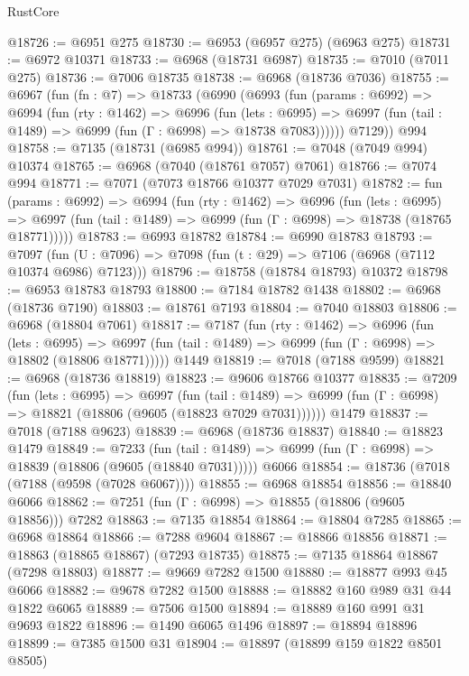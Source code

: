 \begin{lexlean}{RustCore}
\begin{coremodule}
@18726 := @6951 @275
@18730 := @6953 (@6957 @275) (@6963 @275)
@18731 := @6972 @10371
@18733 := @6968 (@18731 @6987)
@18735 := @7010 (@7011 @275)
@18736 := @7006 @18735
@18738 := @6968 (@18736 @7036)
@18755 := @6967
    (fun (fn : @7) =>
    @18733
      (@6990
        (@6993
          (fun (params : @6992) =>
          @6994
            (fun (rty : @1462) =>
            @6996
              (fun (lets : @6995) =>
              @6997 (fun (tail : @1489) => @6999 (fun (Γ : @6998) => @18738 @7083))))))
        @7129))
    @994
@18758 := @7135 (@18731 (@6985 @994))
@18761 := @7048 (@7049 @994) @10374
@18765 := @6968 (@7040 (@18761 @7057) @7061)
@18766 := @7074 @994
@18771 := @7071 (@7073 @18766 @10377 @7029 @7031)
@18782 := fun (params : @6992) =>
  @6994
    (fun (rty : @1462) =>
    @6996
      (fun (lets : @6995) =>
      @6997 (fun (tail : @1489) => @6999 (fun (Γ : @6998) => @18738 (@18765 @18771)))))
@18783 := @6993 @18782
@18784 := @6990 @18783
@18793 := @7097
    (fun (U : @7096) => @7098 (fun (t : @29) => @7106 (@6968 (@7112 @10374 @6986) @7123)))
@18796 := @18758 (@18784 @18793) @10372
@18798 := @6953 @18783 @18793
@18800 := @7184 @18782 @1438
@18802 := @6968 (@18736 @7190)
@18803 := @18761 @7193
@18804 := @7040 @18803
@18806 := @6968 (@18804 @7061)
@18817 := @7187
    (fun (rty : @1462) =>
    @6996
      (fun (lets : @6995) =>
      @6997 (fun (tail : @1489) => @6999 (fun (Γ : @6998) => @18802 (@18806 @18771)))))
    @1449
@18819 := @7018 (@7188 @9599)
@18821 := @6968 (@18736 @18819)
@18823 := @9606 @18766 @10377
@18835 := @7209
    (fun (lets : @6995) =>
    @6997
      (fun (tail : @1489) =>
      @6999 (fun (Γ : @6998) => @18821 (@18806 (@9605 (@18823 @7029 @7031))))))
    @1479
@18837 := @7018 (@7188 @9623)
@18839 := @6968 (@18736 @18837)
@18840 := @18823 @1479
@18849 := @7233
    (fun (tail : @1489) => @6999 (fun (Γ : @6998) => @18839 (@18806 (@9605 (@18840 @7031)))))
    @6066
@18854 := @18736 (@7018 (@7188 (@9598 (@7028 @6067))))
@18855 := @6968 @18854
@18856 := @18840 @6066
@18862 := @7251 (fun (Γ : @6998) => @18855 (@18806 (@9605 @18856))) @7282
@18863 := @7135 @18854
@18864 := @18804 @7285
@18865 := @6968 @18864
@18866 := @7288 @9604
@18867 := @18866 @18856
@18871 := @18863 (@18865 @18867) (@7293 @18735)
@18875 := @7135 @18864 @18867 (@7298 @18803)
@18877 := @9669 @7282 @1500
@18880 := @18877 @993 @45 @6066
@18882 := @9678 @7282 @1500
@18888 := @18882 @160 @989 @31 @44 @1822 @6065
@18889 := @7506 @1500
@18894 := @18889 @160 @991 @31 @9693 @1822
@18896 := @1490 @6065 @1496
@18897 := @18894 @18896
@18899 := @7385 @1500 @31
@18904 := @18897 (@18899 @159 @1822 @8501 @8505)

\end{coremodule}
\end{lexlean}
